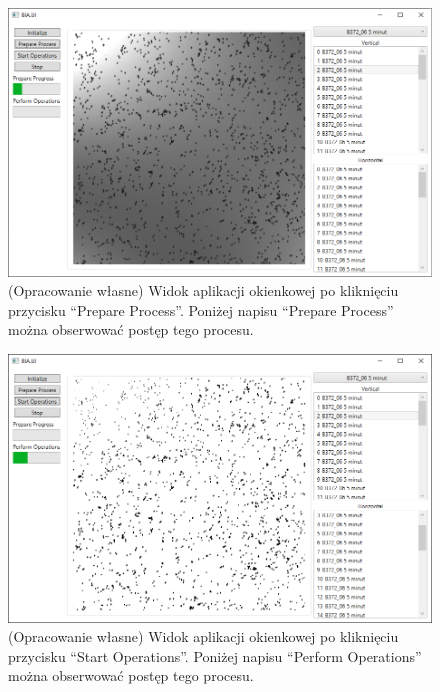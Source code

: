 \documentclass{article}
\begin{document}
{\begin{figure}[H]
                \label{okienkowaapkacontextmenu}
            \end{figure}
            \begin{figure}[H]
                \includegraphics[width=\textwidth]{okienkowa-biaa.png}
                \caption{(Opracowanie własne) Widok aplikacji okienkowej po kliknięciu przycisku ``Prepare Process''.
                Poniżej napisu ``Prepare Process'' można obserwować postęp tego procesu.}
                \label{okienkowaapkabiaa}
            \end{figure}
            \begin{figure}[H]
                \includegraphics[width=\textwidth]{okienkowa-oper.png}
                \caption{(Opracowanie własne) Widok aplikacji okienkowej po kliknięciu przycisku ``Start Operations''.
                Poniżej napisu ``Perform Operations'' można obserwować postęp tego procesu.}
                \label{okienkowaapkaoper}
            \end{figure}
}
\end{document}

